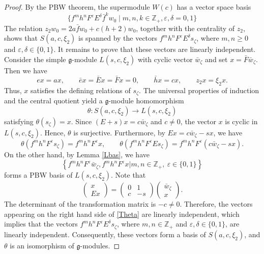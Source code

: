 \documentclass[a4paper,10pt]{article}
\theoremstyle{definition}
\theoremstyle{plain}
\theoremstyle{remark}
\theoremstyle{mystyle}
\numberwithin{equation}{section}
\begin{document}
\begin{proof}
    By the PBW theorem, the supermodule \(W(c)\) has a vector space basis \[\{f^mh^nF^\varepsilon E^\delta\bar f^kw_0\mid m,n,k\in\mathbb{Z}_+, \varepsilon, \delta =0, 1\}\]
    The relation \(z_2w_0=2a\bar fw_0+c(h+2)w_0\), together with the centrality of \(z_2\), shows that $S(a,c,\xi_2)$ is spanned by the vectors $f^mh^nF^\varepsilon E^\delta s_{\zeta}$, where $m,n\geq 0$ and $\varepsilon ,\delta\in \{0,1\}$. It remains to prove that these vectors are linearly independent. Consider the simple $\mathfrak g$-module $L(s,c,\xi_2)$ with cyclic vector $\bar w_{\zeta}$ and set $x=\bar F\bar w_{\zeta }.$ Then we have
    \[
    ex=ax,\qquad\bar ex=\bar Ex=\bar Fx=0,\qquad\bar hx=cx,\qquad z_2x=\xi_2x.
    \]
    Thus, \(x\) satisfies the defining relations of \(s_\zeta\). The universal properties of induction and the central quotient yield a $\mathfrak{g}$-module homomorphism
    \[
    \theta:S(a,c,\xi_2)\to L(s,c,\xi_2)
    \]
    satisfying $\theta(s_{\zeta})=x$. Since $(E+s)x=c\bar w_{\zeta}$ and $c\neq 0$, the vector \(x\) is cyclic in \(L(s,c,\xi_2)\). Hence, \(\theta\) is surjective. Furthermore, by $Ex=c\bar w_{\zeta}-sx$, we have
    \begin{equation}\label{Theta}
        \theta\left(f^mh^nF^\varepsilon s_{\zeta}\right)=f^mh^nF^\varepsilon x,\qquad \theta\left(f^mh^nF^\varepsilon Es_{\zeta}\right)=f^mh^nF^\varepsilon(c\bar w_{\zeta}-sx).
    \end{equation}
    On the other hand, by Lemma \ref{Lbas}, we have
    \[
    \left\{f^mh^nF^\varepsilon \bar w_{\zeta},f^mh^nF^\varepsilon x|m,n\in\mathbb{Z}_+,\ \varepsilon\in \{0,1\}\right\}
    \] 
    forms a PBW basis of \(L(s,c,\xi_2)\). Note that 
    $$
    \begin{pmatrix}x\\Ex\end{pmatrix}=\begin{pmatrix}0&1\\c&-s\end{pmatrix}\begin{pmatrix}\bar w_{\zeta}\\x\end{pmatrix}.
    $$
    The determinant of the transformation matrix is $-c\neq0.$ Therefore, the vectors appearing on the right hand side of \eqref{Theta} are linearly independent, which implies that the vectors $f^mh^nF^\varepsilon E^\delta s_{\zeta}$, where $m,n\in\mathbb{Z}_+$ and $\varepsilon,\delta\in \{0,1\}$, are linearly independent. Consequently, these vectors form a basis of \(S(a,c,\xi_2)\), and \(\theta\) is an isomorphism of $\mathfrak g$-modules.
\end{proof}
\end{document}
